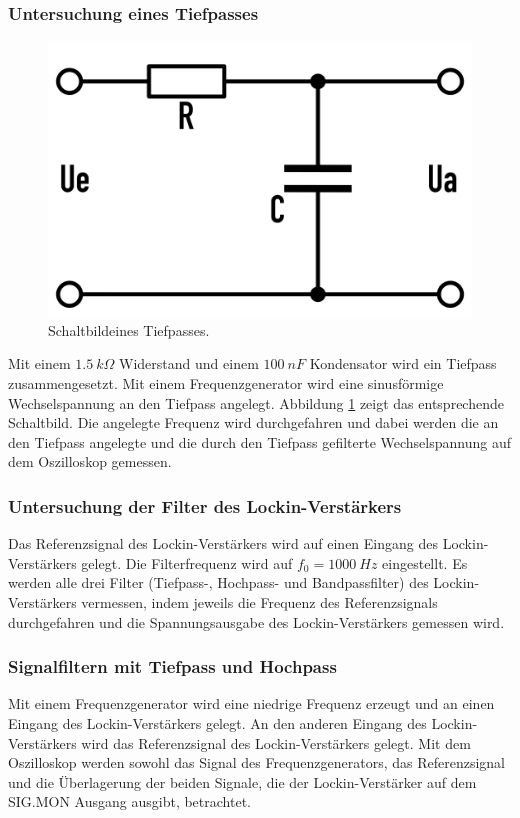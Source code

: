 \documentclass[12pt,a4paper]{article}
\begin{document}
\subsubsection{Untersuchung eines Tiefpasses}

\begin{figure}
\centering
\includegraphics[scale=0.1]{Bilder/Vorversuch1/Tiefpass_Schaltbild.png}
\caption[test]{Schaltbild\footnotemark eines Tiefpasses.}
\label{fig:Tiefpass_Schaltbild}
\end{figure}

Mit einem $\SI{1,5}{k \Omega}$ Widerstand und einem $\SI{100}{nF}$ Kondensator wird ein Tiefpass zusammengesetzt. Mit einem Frequenzgenerator wird eine sinusförmige Wechselspannung an den Tiefpass angelegt. Abbildung \ref{fig:Tiefpass_Schaltbild} zeigt das entsprechende Schaltbild. Die angelegte Frequenz wird durchgefahren und dabei werden die an den Tiefpass angelegte und die durch den Tiefpass gefilterte Wechselspannung auf dem Oszilloskop gemessen.

\subsubsection{Untersuchung der Filter des Lockin-Verstärkers}
Das Referenzsignal des Lockin-Verstärkers wird auf einen Eingang des Lockin-Verstärkers gelegt. Die Filterfrequenz wird auf $f_0 = \SI{1000}{Hz}$ eingestellt. Es werden alle drei Filter (Tiefpass-, Hochpass- und Bandpassfilter) des Lockin-Verstärkers vermessen, indem jeweils die Frequenz des Referenzsignals durchgefahren und die Spannungsausgabe des Lockin-Verstärkers gemessen wird.

\subsubsection{Signalfiltern mit Tiefpass und Hochpass}
Mit einem Frequenzgenerator wird eine niedrige Frequenz erzeugt und an einen Eingang des Lockin-Verstärkers gelegt. An den anderen Eingang des Lockin-Verstärkers wird das Referenzsignal des Lockin-Verstärkers gelegt. Mit dem Oszilloskop werden sowohl das Signal des Frequenzgenerators, das Referenzsignal und die Überlagerung der beiden Signale, die der Lockin-Verstärker auf dem SIG.MON Ausgang ausgibt, betrachtet.\\
\end{document}
